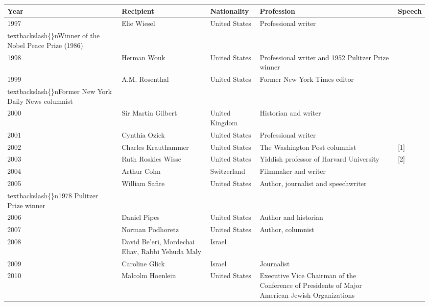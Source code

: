 \documentclass{article}
\begin{document}
\begin{tabular}{lllll}
\toprule
Year & Recipient & Nationality & Profession & Speech \\
\midrule
1997 & Elie Wiesel & United States & Professional writer\\textbackslash\{\}nWinner of the Nobel Peace Prize (1986) &  \\
1998 & Herman Wouk & United States & Professional writer and 1952 Pulitzer Prize winner &  \\
1999 & A.M. Rosenthal & United States & Former New York Times editor\\textbackslash\{\}nFormer New York Daily News columnist &  \\
2000 & Sir Martin Gilbert & United Kingdom & Historian and writer &  \\
2001 & Cynthia Ozick & United States & Professional writer &  \\
2002 & Charles Krauthammer & United States & The Washington Post columnist & [1] \\
2003 & Ruth Roskies Wisse & United States & Yiddish professor of Harvard University & [2] \\
2004 & Arthur Cohn & Switzerland & Filmmaker and writer &  \\
2005 & William Safire & United States & Author, journalist and speechwriter\\textbackslash\{\}n1978 Pulitzer Prize winner &  \\
2006 & Daniel Pipes & United States & Author and historian &  \\
2007 & Norman Podhoretz & United States & Author, columnist &  \\
2008 & David Be'eri, Mordechai Eliav, Rabbi Yehuda Maly & Israel &  &  \\
2009 & Caroline Glick & Israel & Journalist &  \\
2010 & Malcolm Hoenlein & United States & Executive Vice Chairman of the Conference of Presidents of Major American Jewish Organizations &  \\
\bottomrule
\end{tabular}
\end{document}
